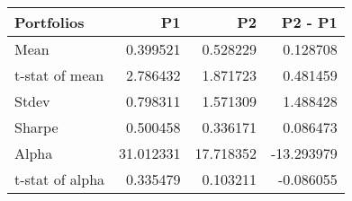 \begin{tabular}{lrrr}
\toprule
Portfolios & P1 & P2 & P2 - P1 \\
\midrule
Mean & 0.399521 & 0.528229 & 0.128708 \\
t-stat of mean & 2.786432 & 1.871723 & 0.481459 \\
Stdev & 0.798311 & 1.571309 & 1.488428 \\
Sharpe & 0.500458 & 0.336171 & 0.086473 \\
Alpha & 31.012331 & 17.718352 & -13.293979 \\
t-stat of alpha & 0.335479 & 0.103211 & -0.086055 \\
\bottomrule
\end{tabular}
